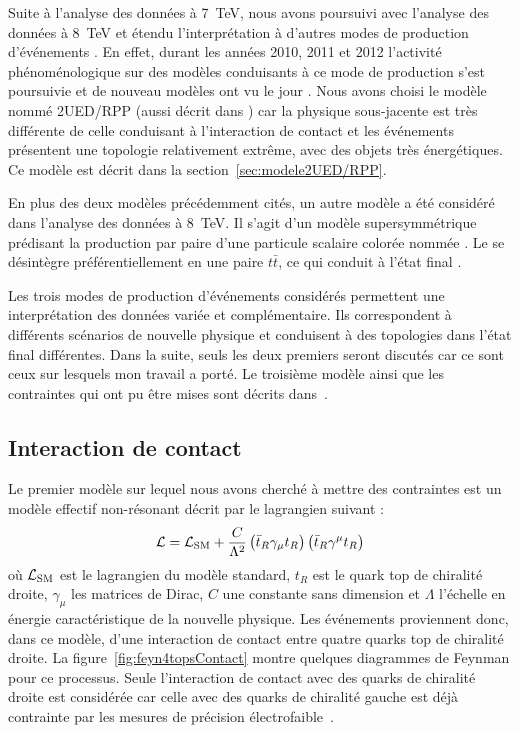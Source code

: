 Suite \`a l'analyse des donn\'ees \`a 7~TeV, nous avons poursuivi avec l'analyse des donn\'ees \`a 8~TeV et \'etendu l'interpr\'etation \`a d'autres modes de production d'\'ev\'enements \fourtop. En effet, durant les ann\'ees 2010, 2011 et 2012 l'activit\'e ph\'enom\'enologique sur des mod\`eles conduisants \`a ce mode de production s'est poursuivie et de nouveau mod\`eles ont vu le jour \cite{Lyon11,Jung:2010ms,Kane:2011zd,Frigerio:2011zg}. Nous avons choisi le mod\`ele nommé 2UED/RPP \cite{Lyon11} (aussi d\'ecrit dans \cite{Lyon09,Lyon12,Lyon4t}) car la physique sous-jacente est très différente de celle conduisant à l'interaction de contact et les événements pr\'esentent une topologie relativement extr\^eme, avec des objets tr\`es \'energ\'etiques. Ce mod\`ele est d\'ecrit dans la section~\ref{sec:modele2UED/RPP}.

En plus des deux mod\`eles pr\'ec\'edemment cit\'es, un autre mod\`ele a \'et\'e consid\'er\'e dans l'analyse des donn\'ees \`a 8~TeV. Il s'agit d'un mod\`ele supersymm\'etrique pr\'edisant la production par paire d'une particule scalaire color\'ee nomm\'ee . Le  se d\'esint\`egre pr\'ef\'erentiellement en une paire $t\bar{t}$, ce qui conduit \`a l'\'etat final \fourtop. 

Les trois modes de production d'\'ev\'enements \fourtop{} consid\'er\'es permettent une interpr\'etation des donn\'ees vari\'ee et compl\'ementaire. Ils correspondent \`a diff\'erents sc\'enarios de nouvelle physique et conduisent \`a des topologies dans l'\'etat final diff\'erentes. Dans la suite, seuls les deux premiers seront discut\'es car ce sont ceux sur lesquels mon travail a port\'e. Le troisi\`eme mod\`ele ainsi que les contraintes qui ont pu \^etre mises sont d\'ecrits dans~\cite{valery:tel-01079982,Aad:2015gdg}.

\subsection{Interaction de contact}
\label{sec:interactionContact}

Le premier mod\`ele sur lequel nous avons cherch\'e \`a mettre des contraintes est un mod\`ele effectif non-r\'esonant d\'ecrit par le lagrangien suivant :
\begin{equation}
\label{eq:LagrangianContactInteraction}
{\cal L} = {\cal L}_\text{SM}+\frac{C}{\Lambda^2}\left(\bar{t}_R\gamma_\mu t_R\right)\left(\bar{t}_R\gamma^\mu t_R\right)
\end{equation}
o\`u ${\cal L}_\text{SM}$ est le lagrangien du mod\`ele standard, $t_R$ est le quark top de chiralit\'e droite, $\gamma_\mu$ les matrices de Dirac, $C$ une constante sans dimension et $\Lambda$ l'\'echelle en \'energie caract\'eristique de la nouvelle physique. Les \'ev\'enements \fourtop{} proviennent donc, dans ce mod\`ele, d'une interaction de contact entre quatre quarks top de chiralit\'e droite. La figure~\ref{fig:feyn4topsContact} montre quelques diagrammes de Feynman pour ce processus. Seule l'interaction de contact avec des quarks de chiralit\'e droite est consid\'er\'ee car celle avec des quarks de chiralit\'e gauche est d\'ej\`a contrainte par les mesures de pr\'ecision \'electrofaible~\cite{PhysRevD.51.3888}. 

